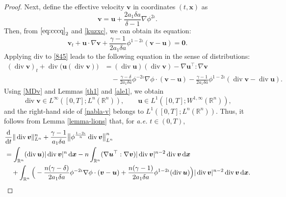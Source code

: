 \documentclass[11pt,reqno]{amsart}
\DeclareMathOperator{\diver}{\mathrm{div}}
\numberwithin{rk}{section}
\numberwithin{prop}{section}
\numberwithin{mydef}{section}
\numberwithin{lem}{section}
\numberwithin{equation}{section}
\numberwithin{thm}{section}
\begin{document}
\begin{proof}
Next, define the effective velocity $\boldsymbol{v}$ in coordinates $(t,\boldsymbol{x})$ as
\begin{equation}\label{MDv}
\boldsymbol{v}=\boldsymbol{u}+\frac{2a_1\delta a}{\delta-1}\nabla \phi^{2\iota}.    
\end{equation}
Then, from $\eqref{eq:cccq}_2$ and \eqref{kuzxc}, we can obtain its equation:
\begin{equation}\label{845}
\boldsymbol{v}_t+\boldsymbol{u}\cdot\nabla\boldsymbol{v}+\frac{\gamma-1}{2a_1\delta a}\phi^{1-2\iota}(\boldsymbol{v}-\boldsymbol{u})=\boldsymbol{0}.
\end{equation}
Applying $\mathrm{div}$ to \eqref{845} leads to the following equation in the sense of distributions:
\begin{equation}\label{nabla-v}
\begin{aligned}
(\diver\boldsymbol{v})_t+\diver\big(\boldsymbol{u} (\diver\boldsymbol{v})\big)&=(\diver\boldsymbol{u})(\diver\boldsymbol{v})-\nabla\boldsymbol{u}^\top:\nabla\boldsymbol{v}\\
&\quad -\frac{\gamma-\delta}{2a_1\delta a} \phi^{-2\iota}\nabla\phi\cdot(\boldsymbol{v}-\boldsymbol{u})-\frac{\gamma-1}{2a_1\delta a}\phi^{1-2\iota}(\diver\boldsymbol{v}-\diver\boldsymbol{u}).
\end{aligned}
\end{equation}
Using \eqref{MDv} and Lemmas \ref{th1} and \ref{ale1}, we obtain
\begin{equation}
\diver\boldsymbol{v}\in L^\infty([0,T];L^n(\mathbb{R}^n)),\qquad \boldsymbol{u}\in L^1([0,T];W^{1,\infty}(\mathbb{R}^n)),    
\end{equation}
and the right-hand side of \eqref{nabla-v} belongs to $L^1([0,T];L^n(\mathbb{R}^n))$. 
Thus, it follows from Lemma \ref{lemma-lions} that, for {\it a.e.} $t\in (0,T)$,
\begin{equation}
\begin{aligned}
&\frac{\mathrm{d}}{\mathrm{d}t}\|\diver\boldsymbol{v}\|_{L^n}^{n}+\frac{\gamma-1}{a_1\delta a}\big\|\phi^\frac{1-2\iota}{n}\diver\boldsymbol{v}\big\|_{L^n}^{n}\notag\\
&=\int_{\mathbb{R}^n}  (\diver\boldsymbol{u}) |\diver\boldsymbol{v}|^n\,\mathrm{d}\boldsymbol{x}-n\int_{\mathbb{R}^n} (\nabla\boldsymbol{u}^\top:\nabla\boldsymbol{v})|\diver\boldsymbol{v}|^{n-2}\diver\boldsymbol{v}\,\mathrm{d}\boldsymbol{x} \\
&\quad +\int_{\mathbb{R}^n} \Big(-\frac{n(\gamma-\delta)}{2a_1\delta a}\phi^{-2\iota}\nabla\phi\cdot(\boldsymbol{v}-\boldsymbol{u})+\frac{n(\gamma-1)}{2a_1\delta a}\phi^{1-2\iota}(\diver\boldsymbol{u})\Big)|\diver\boldsymbol{v}|^{n-2}\diver\boldsymbol{v}\,\mathrm{d}\boldsymbol{x}.\notag

\end{aligned}
\end{equation}
\end{proof}
\end{document}
